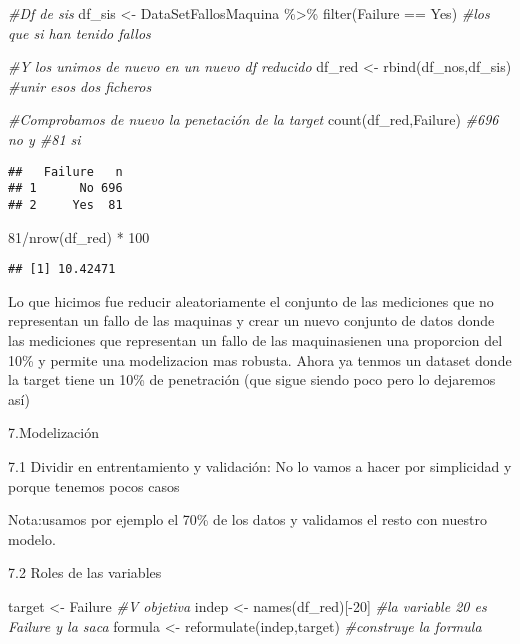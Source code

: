 \documentclass[
]{article}
\newenvironment{Shaded}{\begin{snugshade}}{\end{snugshade}}
\newcommand{\CommentTok}[1]{\textcolor[rgb]{0.56,0.35,0.01}{\textit{#1}}}
\newcommand{\DecValTok}[1]{\textcolor[rgb]{0.00,0.00,0.81}{#1}}
\newcommand{\FunctionTok}[1]{\textcolor[rgb]{0.00,0.00,0.00}{#1}}
\newcommand{\NormalTok}[1]{#1}
\newcommand{\OtherTok}[1]{\textcolor[rgb]{0.56,0.35,0.01}{#1}}
\newcommand{\SpecialCharTok}[1]{\textcolor[rgb]{0.00,0.00,0.00}{#1}}
\newcommand{\StringTok}[1]{\textcolor[rgb]{0.31,0.60,0.02}{#1}}
\begin{document}
\begin{Shaded}
\begin{Highlighting}[]
\CommentTok{\#Df de sis}
\NormalTok{df\_sis }\OtherTok{\textless{}{-}}\NormalTok{ DataSetFallosMaquina }\SpecialCharTok{\%\textgreater{}\%} \FunctionTok{filter}\NormalTok{(Failure }\SpecialCharTok{==} \StringTok{\textquotesingle{}Yes\textquotesingle{}}\NormalTok{) }\CommentTok{\#los que si han tenido fallos}

\CommentTok{\#Y los unimos de nuevo en un nuevo df reducido}
\NormalTok{df\_red }\OtherTok{\textless{}{-}} \FunctionTok{rbind}\NormalTok{(df\_nos,df\_sis) }\CommentTok{\#unir esos dos ficheros}

\CommentTok{\#Comprobamos de nuevo la penetación de la target}
\FunctionTok{count}\NormalTok{(df\_red,Failure) }\CommentTok{\#696 no y \#81 si}
\end{Highlighting}
\end{Shaded}

\begin{verbatim}
##   Failure   n
## 1      No 696
## 2     Yes  81
\end{verbatim}

\begin{Shaded}
\begin{Highlighting}[]
\DecValTok{81}\SpecialCharTok{/}\FunctionTok{nrow}\NormalTok{(df\_red) }\SpecialCharTok{*} \DecValTok{100}
\end{Highlighting}
\end{Shaded}

\begin{verbatim}
## [1] 10.42471
\end{verbatim}

Lo que hicimos fue reducir aleatoriamente el conjunto de las mediciones
que no representan un fallo de las maquinas y crear un nuevo conjunto de
datos donde las mediciones que representan un fallo de las maquinasienen
una proporcion del 10\% y permite una modelizacion mas robusta. Ahora ya
tenmos un dataset donde la target tiene un 10\% de penetración (que
sigue siendo poco pero lo dejaremos así)

7.Modelización

7.1 Dividir en entrentamiento y validación: No lo vamos a hacer por
simplicidad y porque tenemos pocos casos

Nota:usamos por ejemplo el 70\% de los datos y validamos el resto con
nuestro modelo.

7.2 Roles de las variables

\begin{Shaded}
\begin{Highlighting}[]
\NormalTok{target }\OtherTok{\textless{}{-}} \StringTok{\textquotesingle{}Failure\textquotesingle{}} \CommentTok{\#V objetiva}
\NormalTok{indep }\OtherTok{\textless{}{-}} \FunctionTok{names}\NormalTok{(df\_red)[}\SpecialCharTok{{-}}\DecValTok{20}\NormalTok{] }\CommentTok{\#la variable 20 es Failure y la saca}
\NormalTok{formula }\OtherTok{\textless{}{-}} \FunctionTok{reformulate}\NormalTok{(indep,target) }\CommentTok{\#construye la formula}
\end{Highlighting}
\end{Shaded}
\end{document}
